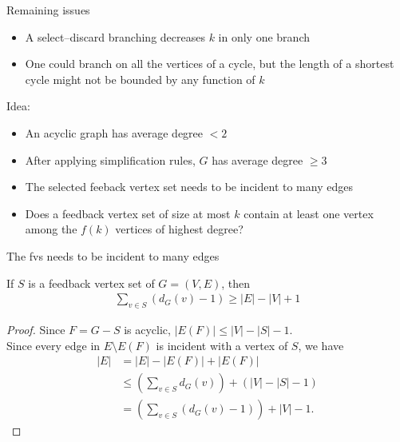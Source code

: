 \begin{frame}{Remaining issues}

 \begin{itemize}
  \item A select--discard branching decreases $k$ in only one branch
  \item One could branch on all the vertices of a cycle, but the length of a shortest cycle might not be bounded by any function of $k$
 \end{itemize}
 
 \pause
 Idea:
 \begin{itemize}
  \item An acyclic graph has average degree $<2$
  \item After applying simplification rules, $G$ has average degree $\ge 3$
  \item The selected feeback vertex set needs to be incident to many edges
  \item Does a feedback vertex set of size at most $k$ contain at least one vertex among the $f(k)$ vertices of highest degree?
 \end{itemize}

\end{frame}

\begin{frame}{The fvs needs to be incident to many edges}
 
 \begin{lemma}
  If $S$ is a feedback vertex set of $G=(V,E)$, then
  \begin{align*}
   \sum_{v\in S} (d_G(v)-1) \ge |E|-|V|+1
  \end{align*}
 \end{lemma}
 \pause
 \begin{proof}
  Since $F=G-S$ is acyclic, $|E(F)| \le |V|-|S|-1$.\\
  Since every edge in $E \setminus E(F)$ is incident with a vertex of $S$, we have
  \begin{align*}
   |E| &= |E| - |E(F)| + |E(F)|\\
       &\le \left(\sum_{v\in S} d_G(v)\right) +(|V|-|S|-1)\\
       &= \left(\sum_{v\in S} (d_G(v)-1)\right) +|V|-1.
  \end{align*}
 \end{proof}

\end{frame}

